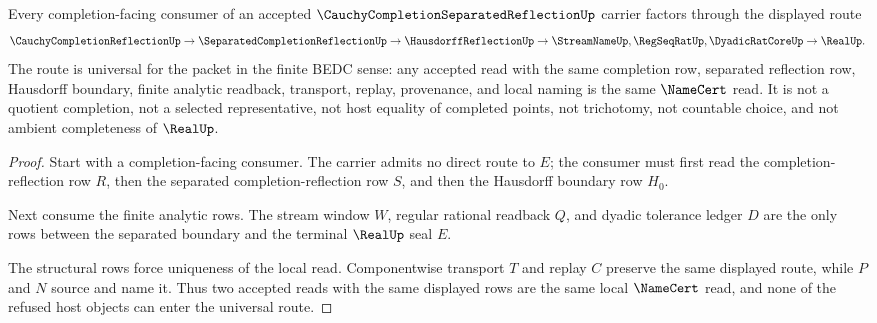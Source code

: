 \begin{theorem}
\label{thm:cauchy-completion-separated-reflection-universal-route}
Every completion-facing consumer of an accepted $\CauchyCompletionSeparatedReflectionUp$ carrier factors through the displayed route
$$
\CauchyCompletionReflectionUp \to \SeparatedCompletionReflectionUp \to \HausdorffReflectionUp \to \StreamNameUp,\RegSeqRatUp,\DyadicRatCoreUp \to \RealUp .
$$
The route is universal for the packet in the finite BEDC sense: any accepted read with the same completion row, separated reflection row, Hausdorff boundary, finite analytic readback, transport, replay, provenance, and local naming is the same $\NameCert$ read. It is not a quotient completion, not a selected representative, not host equality of completed points, not trichotomy, not countable choice, and not ambient completeness of $\RealUp$.
\end{theorem}
\begin{proof}
Start with a completion-facing consumer. The carrier admits no direct route to $E$; the consumer must first read the completion-reflection row $R$, then the separated completion-reflection row $S$, and then the Hausdorff boundary row $H_0$.

Next consume the finite analytic rows. The stream window $W$, regular rational readback $Q$, and dyadic tolerance ledger $D$ are the only rows between the separated boundary and the terminal $\RealUp$ seal $E$.

The structural rows force uniqueness of the local read. Componentwise transport $T$ and replay $C$ preserve the same displayed route, while $P$ and $N$ source and name it. Thus two accepted reads with the same displayed rows are the same local $\NameCert$ read, and none of the refused host objects can enter the universal route.
\end{proof}


